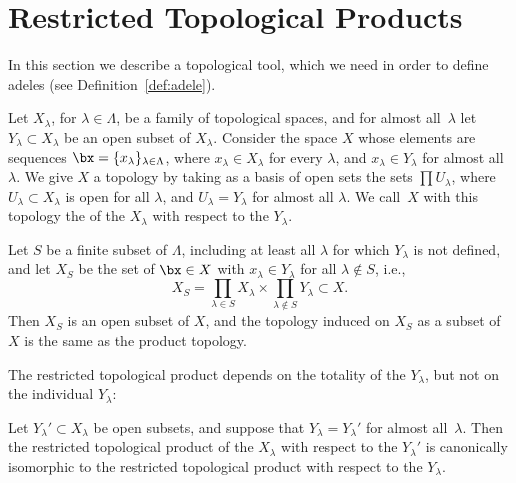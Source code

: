 \section{Restricted Topological Products}

In this section we describe a topological tool, which we need in order
to define adeles (see Definition~\ref{def:adele}).

\begin{definition}
  Let $X_\lambda$, for $\lambda\in\Lambda$, be a family of topological
  spaces, and for almost all~$\lambda$ let $Y_{\lambda}\subset
  X_{\lambda}$ be an open subset of $X_{\lambda}$.  Consider the space
  $X$ whose elements are sequences $\bx = \{x_\lambda\}_{\lambda\in
    \Lambda}$, where $x_\lambda\in X_\lambda$ for every $\lambda$, and
  $x_\lambda\in Y_{\lambda}$ for almost all~$\lambda$.  We give $X$ a
  topology by taking as a basis of open sets the sets $\prod
  U_{\lambda}$, where $U_{\lambda}\subset X_{\lambda}$ is open for all
  $\lambda$, and $U_{\lambda} = Y_{\lambda}$ for almost all $\lambda$.
  We call~$X$ with this topology the  of the $X_{\lambda}$ with respect to the $Y_{\lambda}$.
\end{definition}


\begin{corollary}\label{lem:xs}
  Let $S$ be a finite subset of $\Lambda$, including at least all $\lambda$ for which $Y_\lambda$ is not defined, and let $X_S$ be the set of
  $\bx\in X$ with $x_\lambda\in Y_\lambda$ for all $\lambda\not\in S$,
  i.e.,
  $$
  X_S = \prod_{\lambda \in S} X_{\lambda} \times
  \prod_{\lambda\not\in S} Y_{\lambda} \subset X.
  $$
  Then $X_S$ is an open subset of $X$, and the topology induced on
  $X_S$ as a subset of $X$ is the same as the product topology.
\end{corollary}

The restricted topological product depends on the totality of the
$Y_{\lambda}$, but not on the individual $Y_{\lambda}$:
\begin{lemma}
  Let $Y_{\lambda}'\subset X_{\lambda}$ be open subsets, and suppose
  that $Y_{\lambda} = Y_{\lambda}'$ for almost all~$\lambda$.  Then
  the restricted topological product of the $X_\lambda$ with respect
  to the $Y_{\lambda}'$ is canonically isomorphic to the restricted
  topological product with respect to the $Y_{\lambda}$.
\end{lemma}

